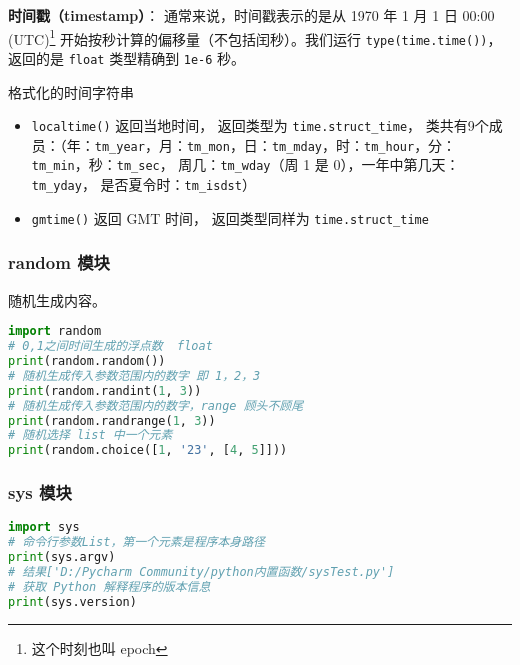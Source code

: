 \textbf{时间戳（timestamp）}： 通常来说，时间戳表示的是从 1970 年 1 月 1 日 00:00 (UTC)\footnote{这个时刻也叫 epoch} 开始按秒计算的偏移量（不包括闰秒）。我们运行 \verb|type(time.time())|， 返回的是 \verb|float| 类型精确到 \verb|1e-6| 秒。

格式化的时间字符串
\begin{itemize}
\item \verb|localtime()| 返回当地时间， 返回类型为 \verb|time.struct_time|， 类共有9个成员：（年：\verb|tm_year|，月：\verb|tm_mon|，日：\verb|tm_mday|，时：\verb|tm_hour|，分：\verb|tm_min|，秒：\verb|tm_sec|， 周几：\verb|tm_wday|（周 1 是 0），一年中第几天：\verb|tm_yday|， 是否夏令时：\verb|tm_isdst|）
\item \verb|gmtime()| 返回 GMT 时间， 返回类型同样为 \verb|time.struct_time|
\end{itemize}

\subsubsection{random 模块}
随机生成内容。
\begin{lstlisting}[language=python]
import random
# 0,1之间时间生成的浮点数  float
print(random.random())
# 随机生成传入参数范围内的数字 即 1，2，3
print(random.randint(1, 3))
# 随机生成传入参数范围内的数字，range 顾头不顾尾
print(random.randrange(1, 3))
# 随机选择 list 中一个元素
print(random.choice([1, '23', [4, 5]]))
\end{lstlisting}

\subsubsection{sys 模块}
\begin{lstlisting}[language=python]
import sys
# 命令行参数List，第一个元素是程序本身路径
print(sys.argv)
# 结果['D:/Pycharm Community/python内置函数/sysTest.py']
# 获取 Python 解释程序的版本信息
print(sys.version)
\end{lstlisting}

